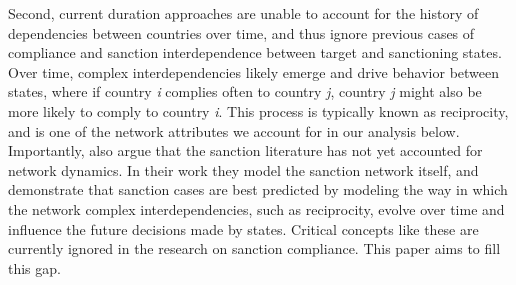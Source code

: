 Second, current duration approaches are unable to account for the history of dependencies between countries over time, and thus ignore previous cases of compliance and sanction interdependence between target and sanctioning states.  Over time, complex interdependencies likely emerge and drive behavior between states, where if country \textit{i} complies often to country \textit{j}, country \textit{j} might also be more likely to comply to country \textit{i}. This process is typically known as reciprocity, and is one of the network attributes we account for in our analysis below. Importantly, \citet{cranmer2014reciprocity} also argue that the sanction literature has not yet accounted for network dynamics. In their work they model the sanction network itself, and demonstrate that sanction cases are best predicted by modeling the way in which the network complex interdependencies, such as reciprocity, evolve over time and influence the future decisions made by states. Critical concepts like these are currently ignored in the research on sanction compliance. This paper aims to fill this gap. 




